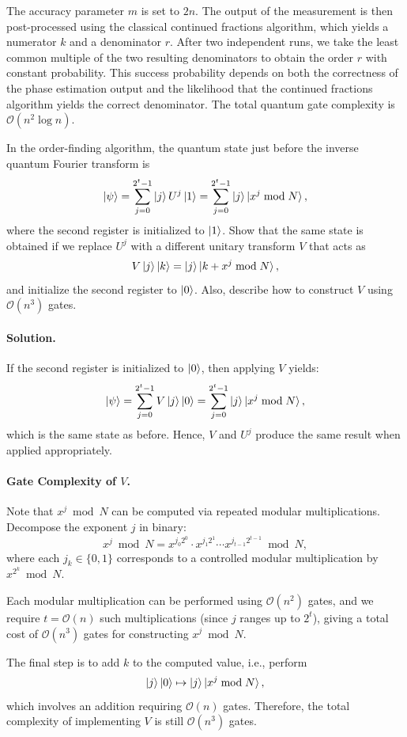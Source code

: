 The accuracy parameter $m$ is set to $2n$. The output of the measurement is then post-processed using the classical continued fractions algorithm, which yields a numerator $k$ and a denominator $r$. After two independent runs, we take the least common multiple of the two resulting denominators to obtain the order $r$ with constant probability. This success probability depends on both the correctness of the phase estimation output and the likelihood that the continued fractions algorithm yields the correct denominator. The total quantum gate complexity is $\mathcal{O}(n^2 \log n)$.

\begin{example}
    In the order-finding algorithm, the quantum state just before the inverse quantum Fourier transform is
    \[
    \ket{\psi} = \sum_{j=0}^{2^t-1} \ket{j} U^j \ket{1} = \sum_{j=0}^{2^t-1} \ket{j} \ket{x^j \bmod N},
    \]
    where the second register is initialized to $\ket{1}$. Show that the same state is obtained if we replace $U^j$ with a different unitary transform $V$ that acts as
    \[
    V \ket{j}\ket{k} = \ket{j} \ket{k + x^j \bmod N},
    \]
    and initialize the second register to $\ket{0}$. Also, describe how to construct $V$ using $\mathcal{O}(n^3)$ gates.

    \paragraph{Solution.}
    If the second register is initialized to $\ket{0}$, then applying $V$ yields:
    \[
    \ket{\psi} = \sum_{j=0}^{2^t-1} V \ket{j} \ket{0} = \sum_{j=0}^{2^t-1} \ket{j} \ket{x^j \bmod N},
    \]
    which is the same state as before. Hence, $V$ and $U^j$ produce the same result when applied appropriately.

    \paragraph{Gate Complexity of $V$.}
    Note that $x^j \bmod N$ can be computed via repeated modular multiplications. Decompose the exponent $j$ in binary:
    \[
    x^j \bmod N = x^{j_0 2^0} \cdot x^{j_1 2^1} \cdots x^{j_{t-1} 2^{t-1}} \bmod N,
    \]
    where each $j_k \in \{0, 1\}$ corresponds to a controlled modular multiplication by $x^{2^k} \bmod N$.

    Each modular multiplication can be performed using $\mathcal{O}(n^2)$ gates, and we require $t = \mathcal{O}(n)$ such multiplications (since $j$ ranges up to $2^t$), giving a total cost of $\mathcal{O}(n^3)$ gates for constructing $x^j \bmod N$.

    The final step is to add $k$ to the computed value, i.e., perform
    \[
    \ket{j} \ket{0} \mapsto \ket{j} \ket{x^j \bmod N},
    \]
    which involves an addition requiring $\mathcal{O}(n)$ gates. Therefore, the total complexity of implementing $V$ is still $\mathcal{O}(n^3)$ gates.
\end{example}


